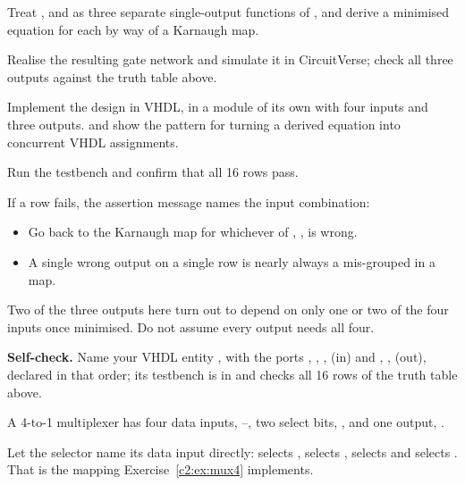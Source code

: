 Treat ,  and  as three separate single-output functions of
, and derive a minimised equation for each by way of a Karnaugh map.

 Realise the resulting gate network and simulate it in CircuitVerse; check all three
outputs against the truth table above.

 Implement the design in VHDL, in a module of its own with four  inputs
and three  outputs.  and  show the
pattern for turning a derived equation into concurrent VHDL assignments.

 Run the testbench and confirm that all 16 rows pass.

If a row fails, the assertion message names the input combination:
\begin{itemize}
  \item Go back to the Karnaugh map for whichever of , ,  is wrong.
  \item A single wrong output on a single row is nearly always a mis-grouped  in a map.
\end{itemize}

\note[Hint]Two of the three outputs here turn out to depend on only one or two of the four inputs
once minimised. Do not assume every output needs all four.


\begin{selfcheck}
\textbf{Self-check.} Name your VHDL entity , with the ports , ,
,  (in) and , ,  (out), declared in that order; its
testbench is in  and checks all 16 rows of the truth table above.
\end{selfcheck}


\label{c2:ex:mux4hand}
A 4-to-1 multiplexer has four data inputs, --, two select bits, , and
one output, .

Let the selector name its data input directly:  selects , 
selects ,  selects  and  selects . That is the mapping
Exercise~\ref{c2:ex:mux4} implements.

